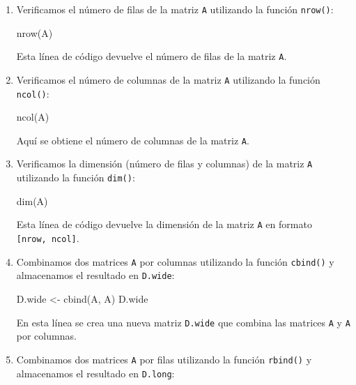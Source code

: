 \documentclass[
  letterpaper,
  DIV=11,
  numbers=noendperiod]{scrartcl}
\newenvironment{Shaded}{}{}
\newcommand{\FunctionTok}[1]{\textcolor[rgb]{0.44,0.26,0.76}{#1}}
\newcommand{\NormalTok}[1]{\textcolor[rgb]{0.14,0.16,0.18}{#1}}
\newcommand{\OtherTok}[1]{\textcolor[rgb]{0.44,0.26,0.76}{#1}}
\begin{document}
\begin{enumerate}
\def\labelenumi{\arabic{enumi}.}
\item
  Verificamos el número de filas de la matriz \texttt{A} utilizando la
  función \texttt{nrow()}:

\begin{Shaded}
\begin{Highlighting}[]
\FunctionTok{nrow}\NormalTok{(A)}
\end{Highlighting}
\end{Shaded}

  Esta línea de código devuelve el número de filas de la matriz
  \texttt{A}.
\item
  Verificamos el número de columnas de la matriz \texttt{A} utilizando
  la función \texttt{ncol()}:

\begin{Shaded}
\begin{Highlighting}[]
\FunctionTok{ncol}\NormalTok{(A)}
\end{Highlighting}
\end{Shaded}

  Aquí se obtiene el número de columnas de la matriz \texttt{A}.
\item
  Verificamos la dimensión (número de filas y columnas) de la matriz
  \texttt{A} utilizando la función \texttt{dim()}:

\begin{Shaded}
\begin{Highlighting}[]
\FunctionTok{dim}\NormalTok{(A)}
\end{Highlighting}
\end{Shaded}

  Esta línea de código devuelve la dimensión de la matriz \texttt{A} en
  formato \texttt{{[}nrow,\ ncol{]}}.
\item
  Combinamos dos matrices \texttt{A} por columnas utilizando la función
  \texttt{cbind()} y almacenamos el resultado en \texttt{D.wide}:

\begin{Shaded}
\begin{Highlighting}[]
\NormalTok{D.wide }\OtherTok{\textless{}{-}} \FunctionTok{cbind}\NormalTok{(A, A)}
\NormalTok{D.wide}
\end{Highlighting}
\end{Shaded}

  En esta línea se crea una nueva matriz \texttt{D.wide} que combina las
  matrices \texttt{A} y \texttt{A} por columnas.
\item
  Combinamos dos matrices \texttt{A} por filas utilizando la función
  \texttt{rbind()} y almacenamos el resultado en \texttt{D.long}:


\end{enumerate}
\end{document}
